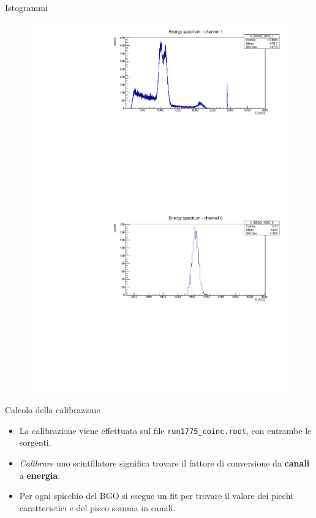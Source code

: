 \documentclass [xcolor=svgnames] {beamer}
\begin{document}
\begin{frame}{Istogrammi}
\begin{figure}
		\vspace{0.4cm} %
		
		\begin{minipage}{0.45\textwidth}
			\centering
			\includegraphics[width=\linewidth]{img/ex1777.pdf} %
		\end{minipage}
		\hfill
		\begin{minipage}{0.45\textwidth}
			\centering
			\includegraphics[width=\linewidth]{img/pulser.pdf} %
		\end{minipage}
	\end{figure}
\end{frame}

\begin{frame}{Calcolo della calibrazione}
	\begin{itemize}
		\item La calibrazione viene effettuata sul file \texttt{run1775\_coinc.root}, con entrambe le sorgenti.
		\item \emph{Calibrare} uno scintillatore significa trovare il fattore di conversione da \textbf{canali} a \textbf{energia}.
		\item Per ogni spicchio del BGO si esegue un fit per trovare il valore dei picchi caratteristici e del picco somma in canali.
	\end{itemize}
\end{frame}
\end{document}
